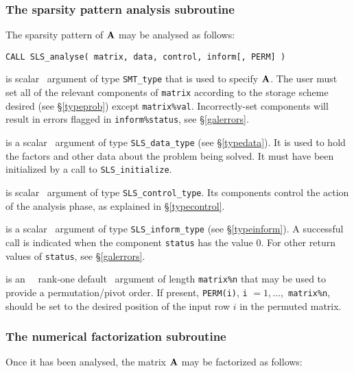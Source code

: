 \documentclass{galahad}
\newcommand{\packagename}{SLS}
\begin{document}

\subsubsection{The sparsity pattern analysis subroutine}
The sparsity pattern of ${\mathbf{A}}$ may be analysed as follows:

\hskip0.5in
{\tt CALL \packagename\_analyse( matrix, data, control, inform[, PERM] )}

\begin{description}
 is scalar \intentin\ argument of type {\tt SMT\_type}
that is used to specify ${\mathbf{A}}$.
The user must set all of the relevant components of {\tt matrix} according
to the storage scheme desired (see \S\ref{typeprob}) except
{\tt matrix\%val}. Incorrectly-set components will result in errors
flagged in {\tt inform\%status}, see \S\ref{galerrors}.

 is a scalar \intentinout\ argument of type
{\tt \packagename\_data\_type}
(see \S\ref{typedata}). It is used to hold the factors and other
data about the problem being solved.
It must have been initialized by a call to
{\tt \packagename\_ini\-tialize}.

 is scalar \intentin\ argument of type
{\tt \packagename\_control\_type}. Its components control the action
of the analysis phase, as explained in
\S\ref{typecontrol}.

 is a scalar \intentinout\ argument of type
{\tt \packagename\_inform\_type}
(see \S\ref{typeinform}).
A successful call is indicated when the  component {\tt status} has the value 0.
For other return values of {\tt status}, see \S\ref{galerrors}.

 is an \optional\ \intentin\ rank-one default \integer\ argument of
length {\tt matrix\%n} that may be used to provide a permutation/pivot
order.
If present, {\tt PERM(i)}, {\tt i} $= 1, \ldots,$ {\tt matrix\%n}, should be set
to the desired position of the input row $i$ in the permuted matrix.

\end{description}


\subsubsection{The numerical factorization subroutine}
Once it has been analysed, the matrix ${\mathbf{A}}$ may be factorized as follows:
\end{document}
